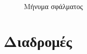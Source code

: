 \documentclass{assignment}
\begin{document}
\begin{figure}
\begin{center}
\caption{Μήνυμα σφάλματος}
\label{fig:settings_fail}
\end{center}
\end{figure}

\section{Διαδρομές}
\end{document}
